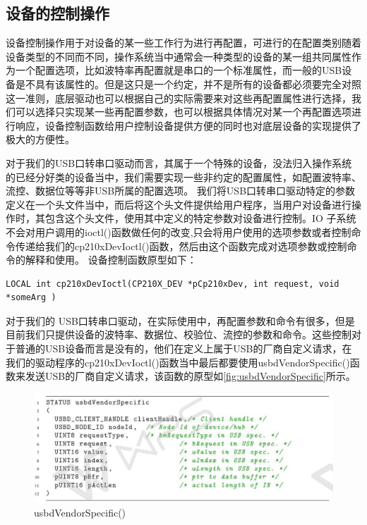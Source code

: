 \subsection{设备的控制操作}
	设备控制操作用于对设备的某一些工作行为进行再配置，可进行的在配置类别随着设备类型的不同而不同，操作系统当中通常会一种类型的设备的某一组共同属性作为一个配置选项，比如波特率再配置就是串口的一个标准属性，而一般的USB设备是不具有该属性的。但是这只是一个约定，并不是所有的设备都必须要完全对照这一准则，底层驱动也可以根据自己的实际需要来对这些再配置属性进行选择，我们可以选择只实现某一些再配置参数，也可以根据具体情况对某一个再配置选项进行响应，设备控制函数给用户控制设备提供方便的同时也对底层设备的实现提供了极大的方便性。
	
	对于我们的USB口转串口驱动而言，其属于一个特殊的设备，没法归入操作系统的已经分好类的设备当中，我们需要实现一些非约定的配置属性，如配置波特率、流控、数据位等等非USB所属的配置选项。
	我们将USB口转串口驱动特定的参数定义在一个头文件当中，而后将这个头文件提供给用户程序，当用户对设备进行操作时，其包含这个头文件，使用其中定义的特定参数对设备进行控制。IO 子系统不会对用户调用的ioctl()函数做任何的改变,只会将用户使用的选项参数或者控制命令传递给我们的cp210xDevIoctl()函数，然后由这个函数完成对选项参数或控制命令的解释和使用。
设备控制函数原型如下：
\lstset{language=C}
\begin{lstlisting}
LOCAL int cp210xDevIoctl(CP210X_DEV *pCp210xDev, int request, void *someArg )
\end{lstlisting}

对于我们的 USB口转串口驱动，在实际使用中，再配置参数和命令有很多，但是目前我们只提供设备的波特率、数据位、校验位、流控的参数和命令。这些控制对于普通的USB设备而言是没有的，他们在定义上属于USB的厂商自定义请求，在我们的驱动程序的cp210xDevIoctl()函数当中最后都要使用usbdVendorSpecific()函数来发送USB的厂商自定义请求，该函数的原型如\autoref{fig:usbdVendorSpecific}所示。


\begin{figure}[!h]
\centering
\includegraphics[width=1.0\textwidth]{./graphics/usbdVendorSpecify.pdf}
\caption{usbdVendorSpecific()}\label{fig:usbdVendorSpecific}
\end{figure}

